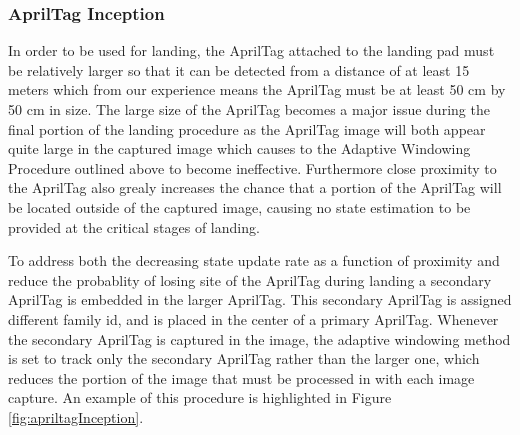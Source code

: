 \documentclass[11pt, twocolumn]{article}
\begin{document}
\subsubsection{AprilTag Inception}
 In order to be used for landing, the AprilTag attached to the landing pad must be relatively larger so that it can be detected from a distance of at least 15 meters which from our experience means the AprilTag must be at least 50 cm by 50 cm in size. The large size of the AprilTag becomes a major issue during the final portion of the landing procedure as the AprilTag image will both appear quite large in the captured image which causes to the Adaptive Windowing Procedure outlined above to become ineffective. Furthermore close proximity to the AprilTag also grealy increases the chance that a portion of the AprilTag will be located outside of the captured image, causing no state estimation to be provided at the critical stages of landing. 
 
To address both the decreasing state update rate as a function of proximity and reduce the probablity of losing site of the AprilTag during landing a secondary AprilTag is embedded in the larger AprilTag. This secondary AprilTag is assigned different family id, and is placed in the center of a primary AprilTag. Whenever the secondary AprilTag is captured in the image, the adaptive windowing method is set to track only the secondary AprilTag rather than the larger one, which reduces the portion of the image that must be processed in with each image capture. An example of this procedure is highlighted in Figure \ref{fig:apriltagInception}.
\end{document}
